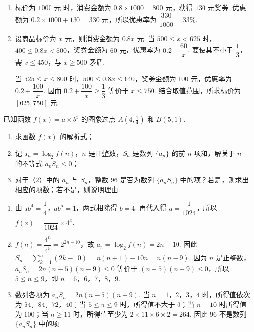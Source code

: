\begin{solution}
\begin{enumerate}
\item 标价为 \(1000\text{ 元}\) 时，消费金额为 \(0.8\times1000=800\text{ 元}\)，获得 \(130\text{ 元}\)奖券. 优惠额为 \(0.2\times1000+130=330\text{ 元}\)，所以优惠率为 \(\dfrac{330}{1000}=33\%\).
\item 设商品标价为 \(x\text{ 元}\)，则消费金额为 \(0.8x\text{ 元}\). 当 \(500\leqslant x<625\) 时，\(400\leqslant0.8x<500\)，奖券金额为 \(60\text{ 元}\)，优惠率为 \(0.2+\dfrac{60}{x}\). 要使其不小于 \(\dfrac{1}{3}\)，需 \(x\leqslant450\)，与 \(x\geqslant500\) 矛盾.

当 \(625\leqslant x\leqslant800\) 时，\(500\leqslant0.8x\leqslant640\)，奖券金额为 \(100\text{ 元}\)，优惠率为 \(0.2+\dfrac{100}{x}\). 因而 \(0.2+\dfrac{100}{x}\geqslant\dfrac{1}{3}\) 等价于 \(x\leqslant750\). 结合取值范围，所求标价为 \([625,750]\text{ 元}\).
\end{enumerate}
\end{solution}

\begin{problem}
已知函数 \(f(x)=a \times b^x\) 的图象过点 \(A\left(4, \frac{1}{4}\right)\) 和 \(B(5,1)\).

\begin{enumerate}
\item 求函数 \(f(x)\) 的解析式；
\item 记 \(a_n = \log_2 f(n)\)，\(n\) 是正整数，\(S_n\) 是数列 \(\{a_n\}\) 的前 \(n\) 项和，解关于 \(n\) 的不等式 \(a_nS_n \leqslant 0\)；
\item 对于（2）中的 \(a_n\) 与 \(S_n\)，整数 \(96\) 是否为数列 \(\{a_nS_n\}\) 中的项？若是，则求出相应的项数；若不是，则说明理由.
\end{enumerate}
\end{problem}

\begin{solution}
\begin{enumerate}
\item 由 \(ab^4=\dfrac{1}{4}\)，\(ab^5=1\)，两式相除得 \(b=4\). 再代入得 \(a=\dfrac{1}{1024}\)，所以 \(f(x)=\dfrac{1}{1024}\times4^x\).
\item \(f(n)=\dfrac{4^n}{4^5}=2^{2n-10}\)，故 \(a_n=\log_2f(n)=2n-10\). 因此
\(\displaystyle S_n=\sum_{k=1}^{n}(2k-10)=n(n+1)-10n=n(n-9)\).
因为 \(n\) 是正整数，\(a_nS_n=2n(n-5)(n-9)\leqslant0\) 等价于 \((n-5)(n-9)\leqslant0\)，所以 \(5\leqslant n\leqslant9\)，即 \(n=5\)，\(6\)，\(7\)，\(8\)，\(9\).
    \item 数列各项为 \(a_nS_n=2n(n-5)(n-9)\). 当 \(n=1\)，\(2\)，\(3\)，\(4\) 时，所得值依次为 \(64\)，\(84\)，\(72\)，\(40\)；当 \(5\leqslant n\leqslant9\) 时，所得值不大于 \(0\)；当 \(n=10\) 时所得值为 \(100\)；当 \(n\geqslant11\) 时，所得值至少为 \(2\times11\times6\times2=264\). 因此 \(96\) 不是数列 \(\{a_nS_n\}\) 中的项.
\end{enumerate}
\end{solution}

